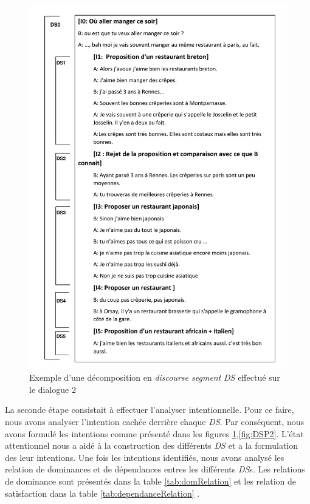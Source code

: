 		\begin{figure}[!h]
			\includegraphics[width=5in]{Figures/dsp_analysis.pdf}
			\caption{\label{fig:DSP} Exemple d'une décomposition en \emph{discourse segment} \emph{DS} effectué sur le dialogue 2}
		\end{figure} 
		
			La seconde étape consistait à effectuer l'analyser intentionnelle. Pour ce faire, nous avons analyser l'intention cachée derrière chaque \emph{DS}. Par conséquent, nous avons formulé les intentions comme présenté dans les figures \ref{fig:DSP},\ref{fig:DSP2}.  L'état attentionnel nous a aidé à la construction des différents \emph{DS} et a la formulation des leur intentions.	
			Une fois les intentions identifiés, nous avons analysé les relation de dominances et de dépendances entres les différents \emph{DS}s. Les relations de dominance sont présentés dans la table \ref{tab:domRelation} et les relation de satisfaction dans la table \ref{tab:dependanceRelation} .
			 
